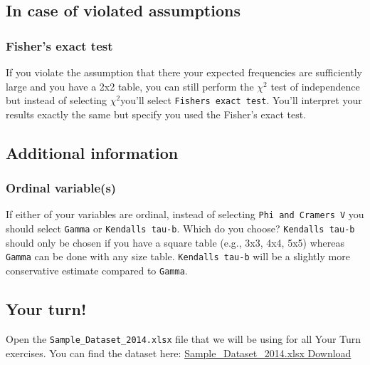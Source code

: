 \documentclass[
]{book}
\begin{document}
\hypertarget{in-case-of-violated-assumptions-3}{%
\subsection{In case of violated assumptions}\label{in-case-of-violated-assumptions-3}}

\hypertarget{fishers-exact-test}{%
\subsubsection{Fisher's exact test}\label{fishers-exact-test}}

If you violate the assumption that there your expected frequencies are sufficiently large and you have a 2x2 table, you can still perform the \(\chi^2\) test of independence but instead of selecting \(\chi^2\)you'll select \texttt{Fisher\textquotesingle{}s\ exact\ test}. You'll interpret your results exactly the same but specify you used the Fisher's exact test.

\hypertarget{additional-information-2}{%
\subsection{Additional information}\label{additional-information-2}}

\hypertarget{ordinal-variables}{%
\subsubsection{Ordinal variable(s)}\label{ordinal-variables}}

If either of your variables are ordinal, instead of selecting \texttt{Phi\ and\ Cramer\textquotesingle{}s\ V} you should select \texttt{Gamma} or \texttt{Kendall\textquotesingle{}s\ tau-b}. Which do you choose? \texttt{Kendall\textquotesingle{}s\ tau-b} should only be chosen if you have a square table (e.g., 3x3, 4x4, 5x5) whereas \texttt{Gamma} can be done with any size table. \texttt{Kendall\textquotesingle{}s\ tau-b} will be a slightly more conservative estimate compared to \texttt{Gamma}.

\hypertarget{your-turn-4}{%
\subsection{Your turn!}\label{your-turn-4}}

Open the \texttt{Sample\_Dataset\_2014.xlsx} file that we will be using for all Your Turn exercises. You can find the dataset here: \href{https://github.com/danawanzer/stats-with-jamovi/blob/master/data/Sample_Dataset_2014.xlsx}{Sample\_Dataset\_2014.xlsx Download}
\end{document}
